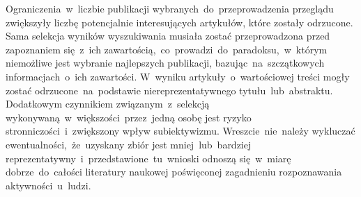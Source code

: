Ograniczenia~w~liczbie publikacji wybranych~do~przeprowadzenia przeglądu zwiększyły liczbę potencjalnie interesujących artykułów, które zostały odrzucone. Sama selekcja wyników wyszukiwania musiała zostać przeprowadzona przed zapoznaniem się~z~ich zawartością,~co~prowadzi~do~paradoksu,~w~którym niemożliwe jest wybranie najlepszych publikacji, bazując~na~szczątkowych informacjach~o~ich zawartości. W~wyniku artykuły~o~wartościowej treści mogły zostać odrzucone~na~podstawie niereprezentatywnego tytułu~lub~abstraktu. Dodatkowym czynnikiem związanym~z~selekcją wykonywaną~w~większości~przez~jedną osobę jest ryzyko stronniczości~i~zwiększony wpływ subiektywizmu. Wreszcie~nie~należy wykluczać ewentualności,~że~uzyskany zbiór jest mniej~lub~bardziej reprezentatywny~i~przedstawione~tu~wnioski odnoszą się~w~miarę dobrze~do~całości literatury naukowej poświęconej zagadnieniu rozpoznawania aktywności~u~ludzi.
